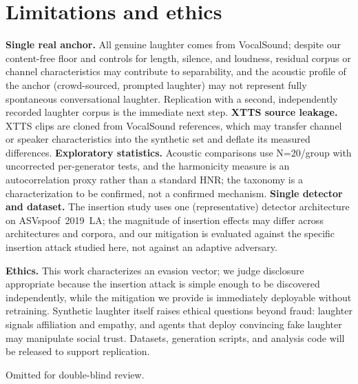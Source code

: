 \documentclass[sigconf,anonymous,review]{acmart}
\begin{document}
\section{Limitations and ethics}
\label{sec:limitations}
\textbf{Single real anchor.} All genuine laughter comes from VocalSound; despite our content-free floor and controls for length, silence, and loudness, residual corpus or channel characteristics may contribute to separability, and the acoustic profile of the anchor (crowd-sourced, prompted laughter) may not represent fully spontaneous conversational laughter. Replication with a second, independently recorded laughter corpus is the immediate next step. \textbf{XTTS source leakage.} XTTS clips are cloned from VocalSound references, which may transfer channel or speaker characteristics into the synthetic set and deflate its measured differences. \textbf{Exploratory statistics.} Acoustic comparisons use N=20/group with uncorrected per-generator tests, and the harmonicity measure is an autocorrelation proxy rather than a standard HNR; the taxonomy is a characterization to be confirmed, not a confirmed mechanism. \textbf{Single detector and dataset.} The insertion study uses one (representative) detector architecture on ASVspoof~2019~LA; the magnitude of insertion effects may differ across architectures and corpora, and our mitigation is evaluated against the specific insertion attack studied here, not against an adaptive adversary.

\textbf{Ethics.} This work characterizes an evasion vector; we judge disclosure appropriate because the insertion attack is simple enough to be discovered independently, while the mitigation we provide is immediately deployable without retraining. Synthetic laughter itself raises ethical questions beyond fraud: laughter signals affiliation and empathy, and agents that deploy convincing fake laughter may manipulate social trust. Datasets, generation scripts, and analysis code will be released to support replication.

\begin{acks}
Omitted for double-blind review.
\end{acks}



\end{document}
